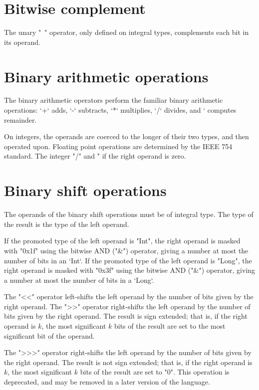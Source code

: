 \section{Bitwise complement}

The unary \xcd"~" operator, only defined on integral types, complements each
bit in its operand.  

\section{Binary arithmetic operations} 

The binary arithmetic operators perform the familiar binary arithmetic
operations: \xcd`+` adds, \xcd`-` subtracts, \xcd`*` multiplies, 
\xcd`/` divides, and \xcd`%
computes remainder.

On integers, the operands are coerced to the longer of their two types, and
then operated upon.  
Floating point operations are determined by the IEEE 754
standard. 
The integer \xcd"/" and \xcd"%
if the right operand is zero.

\section{Binary shift operations}

The operands of the binary shift operations must be of integral type.
The type of the result is the type of the left operand.

If the promoted type of the left operand is \xcd"Int",
the right operand is masked with \xcd"0x1f" using the bitwise
AND (\xcd"&") operator, giving a number at most the number of bits in an
\xcd`Int`. 
If the promoted type of the left operand is \xcd"Long",
the right operand is masked with \xcd"0x3f" using the bitwise
AND (\xcd"&") operator, giving a number at most the number of bits in a
\xcd`Long`. 

The \xcd"<<" operator left-shifts the left operand by the number of
bits given by the right operand.
The \xcd">>" operator right-shifts the left operand by the number of
bits given by the right operand.  The result is sign extended;
that is, if the right operand is $k$,
the most significant $k$ bits of the result are set to the most
significant bit of the operand.

The \xcd">>>" operator right-shifts the left operand by the number of
bits given by the right operand.  The result is not sign extended;
that is, if the right operand is $k$,
the most significant $k$ bits of the result are set to \xcd"0".
This operation is deprecated, and may be removed in a later version of the
language. 

